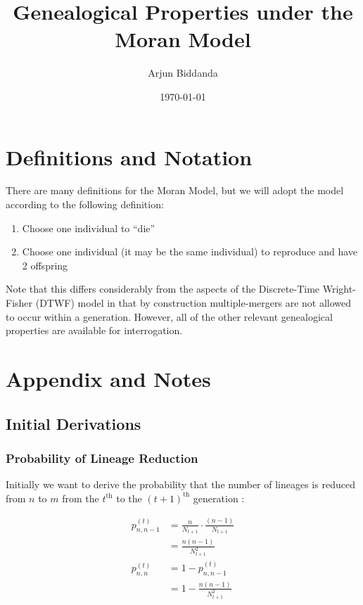 \documentclass[11pt]{article}
\title{Genealogical Properties under the Moran Model}\author{Arjun Biddanda}
\date{\today}
\begin{document}
\maketitle

\section{Definitions and Notation}

There are many definitions for the Moran Model, but we will adopt the model according to the following definition:

\begin{enumerate}
	\item Choose one individual to ``die''
	\item Choose one individual (it may be the same individual) to reproduce and have 2 offspring
\end{enumerate}

Note that this differs considerably from the aspects of the Discrete-Time Wright-Fisher (DTWF) model in that by construction multiple-mergers are not allowed to occur within a generation. However, all of the other relevant genealogical properties are available for interrogation.

\section{Appendix and Notes}

\subsection{Initial Derivations}

\subsubsection{Probability of Lineage Reduction}
Initially we want to derive the probability that the number of lineages is reduced from $n$ to $m$ from the $t^{\text{th}}$ to the $(t+1)^{\text{th}}$ generation :

$$
\begin{aligned}
	p^{(t)}_{n,n-1} &= \frac{n}{N_{t+1}}\cdot \frac{(n-1)}{N_{t+1}}\\
	&= \frac{n(n-1)}{N^2_{t+1}}\\
	p^{(t)}_{n,n} &= 1 - p^{(t)}_{n,n-1}\\
	&= 1 - \frac{n(n-1)}{N^2_{t+1}}\\
\end{aligned}
$$
\end{document}
